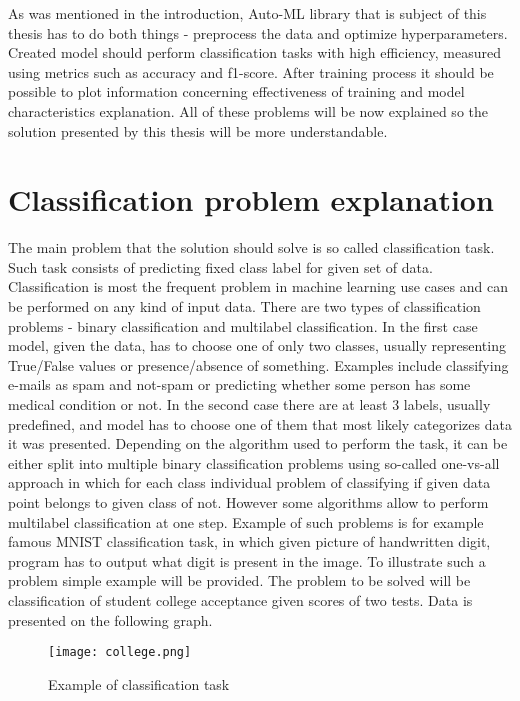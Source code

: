 \documentclass[a4paper,twoside,12pt]{book}
\begin{document}
As was mentioned in the introduction, Auto-ML library that is subject of this thesis has to do both things - preprocess the data and optimize hyperparameters. Created model should perform classification tasks with high efficiency, measured using metrics such as accuracy and f1-score.
After training process it should be possible to plot information concerning effectiveness of training and model characteristics explanation.
All of these problems will be now explained so the solution presented by this thesis will be more understandable.

\section{Classification problem explanation}

The main problem that the solution should solve is so called classification task. Such task consists of predicting fixed class label for given set of data. Classification is most the frequent problem in machine learning use cases and can be performed on any kind of input data. There are two types of classification problems - binary classification and multilabel classification.
In the first case model, given the data, has to choose one of only two classes, usually representing True/False values or presence/absence of something. Examples include classifying e-mails as spam and not-spam or predicting whether some person has some medical condition or not.
In the second case there are at least 3 labels, usually predefined, and model has to choose one of them that most likely categorizes data it was presented. Depending on the algorithm used to perform the task, it can be either split into multiple binary classification problems using so-called one-vs-all approach in which for each class individual problem of classifying if given data point belongs to given class of not. However some algorithms allow to perform multilabel classification at one step. Example of such problems is for example famous MNIST classification task, in which given picture of handwritten digit, program has to output what digit is present in the image.
To illustrate such a problem simple example will be provided. The problem to be solved will be classification of student college acceptance given scores of two tests. Data is presented on the following graph.


\begin{figure}[h]
    \centering
    \texttt{[image: college.png]}
    \caption{Example of classification task}
    \label{fig:mesh1}
\end{figure}
\end{document}
